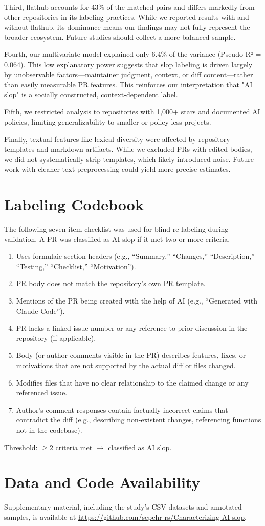 \documentclass[11pt]{article}
\begin{document}
	Third, flathub accounts for 43\% of the matched pairs and differs markedly from other repositories in its labeling practices. While we reported results with and without flathub, its dominance means our findings may not fully represent the broader ecosystem. Future studies should collect a more balanced sample.
	
	Fourth, our multivariate model explained only 6.4\% of the variance (Pseudo R² = 0.064). This low explanatory power suggests that slop labeling is driven largely by unobservable factors—maintainer judgment, context, or diff content—rather than easily measurable PR features. This reinforces our interpretation that "AI slop" is a socially constructed, context-dependent label.
	
	Fifth, we restricted analysis to repositories with 1,000+ stars and documented AI policies, limiting generalizability to smaller or policy-less projects.
	
	Finally, textual features like lexical diversity were affected by repository templates and markdown artifacts. While we excluded PRs with edited bodies, we did not systematically strip templates, which likely introduced noise. Future work with cleaner text preprocessing could yield more precise estimates.
	
	
	
	
	\appendix
	\section{Labeling Codebook}
	
	The following seven-item checklist was used for blind re-labeling during validation. A PR was classified as AI slop if it met two or more criteria.
	
	\begin{enumerate}
		\item Uses formulaic section headers (e.g., ``Summary,'' ``Changes,'' ``Description,'' ``Testing,'' ``Checklist,'' ``Motivation'').
		\item PR body does not match the repository's own PR template.
		\item Mentions of the PR being created with the help of AI (e.g., ``Generated with Claude Code'').
		\item PR lacks a linked issue number or any reference to prior discussion in the repository (if applicable).
		\item Body (or author comments visible in the PR) describes features, fixes, or motivations that are not supported by the actual diff or files changed.
		\item Modifies files that have no clear relationship to the claimed change or any referenced issue.
		\item Author's comment responses contain factually incorrect claims that contradict the diff (e.g., describing non-existent changes, referencing functions not in the codebase).
	\end{enumerate}
	
	\noindent Threshold: $\geq 2$ criteria met $\rightarrow$ classified as AI slop.
	
\section{Data and Code Availability}

Supplementary material, including the study's CSV datasets and annotated samples, is available at \url{https://github.com/sepehr-rs/Characterizing-AI-slop}.
\end{document}
